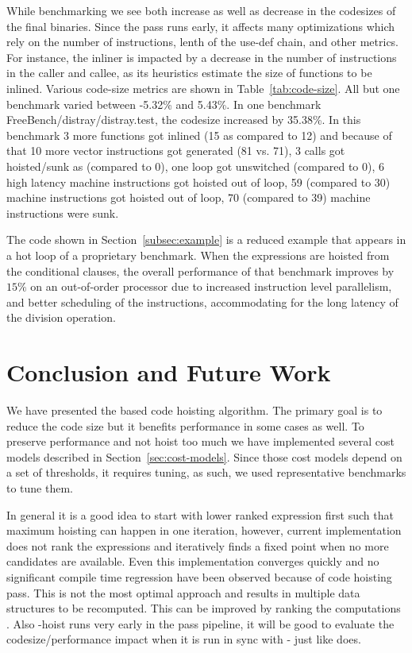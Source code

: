 \documentclass[acmlarge,review]{acmart}\settopmatter{printfolios=true}
\begin{document}
While benchmarking \LLVMTestSuite{} we see both increase as well as decrease in
the codesizes of the final binaries. Since the pass runs early, it affects many
optimizations which rely on the number of instructions, lenth of the use-def
chain, and other metrics. For instance, the inliner is impacted by a decrease in
the number of instructions in the caller and callee, as its heuristics estimate
the size of functions to be inlined. Various code-size metrics are shown in
Table~\ref{tab:code-size}. All but one benchmark varied between -5.32\% and
5.43\%.  In one benchmark FreeBench/distray/distray.test, the codesize increased
by 35.38\%. In this benchmark 3 more functions got inlined (15 as compared to
12) and because of that 10 more vector instructions got generated (81 vs. 71), 3
calls got hoisted/sunk as (compared to 0), one loop got unswitched (compared to
0), 6 high latency machine instructions got hoisted out of loop, 59 (compared to
30) machine instructions got hoisted out of loop, 70 (compared to 39) machine
instructions were sunk.

The code shown in Section~\ref{subsec:example} is a reduced example that appears
in a hot loop of a proprietary benchmark.  When the expressions are hoisted from
the conditional clauses, the overall performance of that benchmark improves by
$15\%$ on an out-of-order processor due to increased instruction level
parallelism, and better scheduling of the instructions, accommodating for the
long latency of the division operation.

\section{Conclusion and Future Work}
\label{sec:future-work}
We have presented the \GVN{} based code hoisting algorithm. The primary goal is to
reduce the code size but it benefits performance in some cases as well. To
preserve performance and not hoist too much we have implemented several cost
models described in Section~\ref{sec:cost-models}. Since those cost models
depend on a set of thresholds, it requires tuning, as such, we used
representative benchmarks to tune them.

In general it is a good idea to start with lower ranked expression first such
that maximum hoisting can happen in one iteration, however, current
implementation does not rank the expressions and iteratively finds a fixed point
when no more candidates are available. Even this implementation converges
quickly and no significant compile time regression have been observed because of
code hoisting pass. This is not the most optimal approach and results in
multiple data structures to be recomputed. This can be improved by ranking the
computations \cite{rosen1988global}. Also \GVN{}-hoist runs very early in the
pass pipeline, it will be good to evaluate the codesize/performance impact when
it is run in sync with \GVN{}-\PRE{} just like \GCC{} does.
\end{document}
